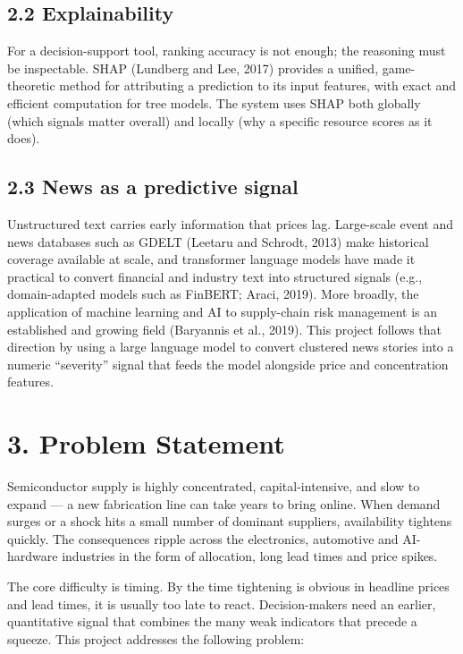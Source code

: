 \documentclass[11pt]{article}
\begin{document}
\subsection{2.2 Explainability}

For a decision-support tool, ranking accuracy is not enough; the reasoning must be inspectable. SHAP (Lundberg and Lee, 2017) provides a unified, game-theoretic method for attributing a prediction to its input features, with exact and efficient computation for tree models. The system uses SHAP both globally (which signals matter overall) and locally (why a specific resource scores as it does).

\subsection{2.3 News as a predictive signal}

Unstructured text carries early information that prices lag. Large-scale event and news databases such as GDELT (Leetaru and Schrodt, 2013) make historical coverage available at scale, and transformer language models have made it practical to convert financial and industry text into structured signals (e.g., domain-adapted models such as FinBERT; Araci, 2019). More broadly, the application of machine learning and AI to supply-chain risk management is an established and growing field (Baryannis et al., 2019). This project follows that direction by using a large language model to convert clustered news stories into a numeric ``severity'' signal that feeds the model alongside price and concentration features.

\section{3. Problem Statement}

Semiconductor supply is highly concentrated, capital-intensive, and slow to expand --- a new fabrication line can take years to bring online. When demand surges or a shock hits a small number of dominant suppliers, availability tightens quickly. The consequences ripple across the electronics, automotive and AI-hardware industries in the form of allocation, long lead times and price spikes.

The core difficulty is timing. By the time tightening is obvious in headline prices and lead times, it is usually too late to react. Decision-makers need an earlier, quantitative signal that combines the many weak indicators that precede a squeeze. This project addresses the following problem:
\end{document}
